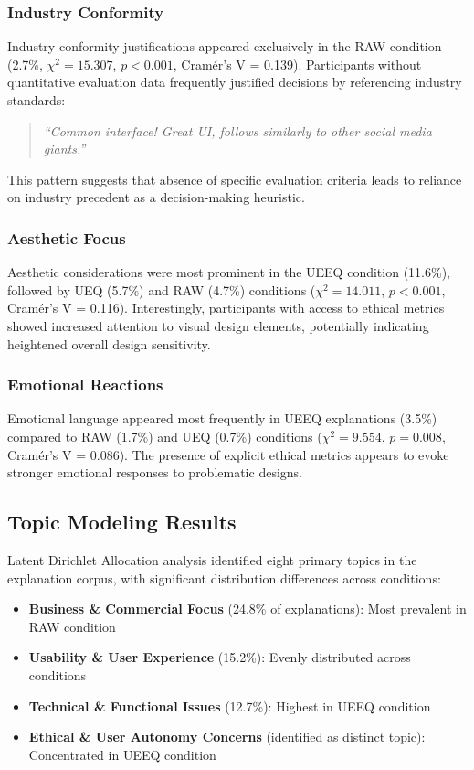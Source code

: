 \subsubsection{Industry Conformity}
Industry conformity justifications appeared exclusively in the RAW condition (2.7\%, $\chi^2 = 15.307$, $p < 0.001$, Cramér's V = 0.139). Participants without quantitative evaluation data frequently justified decisions by referencing industry standards:

\begin{quote}
\textit{``Common interface! Great UI, follows similarly to other social media giants.''}
\end{quote}

This pattern suggests that absence of specific evaluation criteria leads to reliance on industry precedent as a decision-making heuristic.

\subsubsection{Aesthetic Focus}
Aesthetic considerations were most prominent in the UEEQ condition (11.6\%), followed by UEQ (5.7\%) and RAW (4.7\%) conditions ($\chi^2 = 14.011$, $p < 0.001$, Cramér's V = 0.116). Interestingly, participants with access to ethical metrics showed increased attention to visual design elements, potentially indicating heightened overall design sensitivity.

\subsubsection{Emotional Reactions}
Emotional language appeared most frequently in UEEQ explanations (3.5\%) compared to RAW (1.7\%) and UEQ (0.7\%) conditions ($\chi^2 = 9.554$, $p = 0.008$, Cramér's V = 0.086). The presence of explicit ethical metrics appears to evoke stronger emotional responses to problematic designs.

\subsection{Topic Modeling Results}

Latent Dirichlet Allocation analysis identified eight primary topics in the explanation corpus, with significant distribution differences across conditions:

\begin{itemize}
\item \textbf{Business \& Commercial Focus} (24.8\% of explanations): Most prevalent in RAW condition
\item \textbf{Usability \& User Experience} (15.2\%): Evenly distributed across conditions  
\item \textbf{Technical \& Functional Issues} (12.7\%): Highest in UEEQ condition
\item \textbf{Ethical \& User Autonomy Concerns} (identified as distinct topic): Concentrated in UEEQ condition
\end{itemize}

